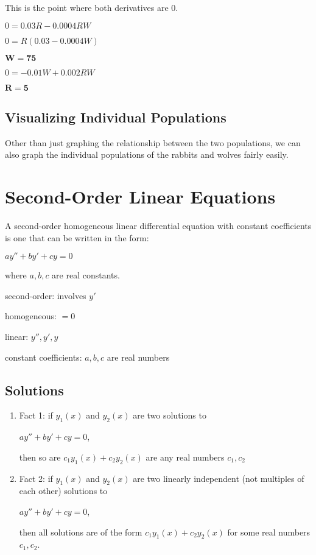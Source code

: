 \documentclass{article}
\begin{document}
This is the point where both derivatives are 0.

$0 = 0.03R - 0.0004RW$

$0 = R(0.03-0.0004W)$

$\mathbf{W = 75}$

$0 = -0.01W + 0.002RW$

$\mathbf{R = 5}$

\subsection{Visualizing Individual Populations}

Other than just graphing the relationship between the two populations, we can also graph the individual populations of the rabbits and wolves fairly easily.

\section{Second-Order Linear Equations}

A second-order homogeneous linear differential equation with constant coefficients is one that can be written in the form:

$ay''+by'+cy=0$ 

where $a,b,c$ are real constants.

second-order: involves $y'$

homogeneous: $=0$

linear: $y'',y',y$

constant coefficients: $a,b,c$ are real numbers

\subsection{Solutions}

\begin{enumerate}
    \item Fact 1: if $y_1(x)$ and $y_2(x)$ are two solutions to
    
    $ay''+by'+cy=0$,
    
    then so are $c_1 y_1(x) + c_2 y_2(x)$ are any real numbers $c_1, c_2$
    
    \item Fact 2: if $y_1(x)$ and $y_2(x)$ are two linearly independent (not multiples of each other) solutions to
    
    $ay''+by'+cy=0$,
    
    then all solutions are of the form $c_1 y_1(x) + c_2 y_2(x)$ for some real numbers $c_1,c_2$.
\end{enumerate}
\end{document}
